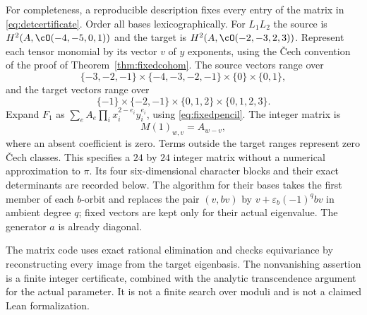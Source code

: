 For completeness, a reproducible description fixes every entry of the
matrix in \eqref{eq:detcertificate}. Order all bases lexicographically.
For $L_1L_2$ the source is $H^2(A,\cO(-4,-5,0,1))$ and the target is
$H^2(A,\cO(-2,-3,2,3))$. Represent each tensor monomial by its vector
$v$ of $y$ exponents, using the \v Cech convention of the proof of
Theorem~\ref{thm:fixedcohom}. The source vectors range over
\[
 \{-3,-2,-1\}\times\{-4,-3,-2,-1\}\times\{0\}\times\{0,1\},
\]
and the target vectors range over
\[
 \{-1\}\times\{-2,-1\}\times\{0,1,2\}\times\{0,1,2,3\}.
\]
Expand $F_1$ as $\sum_e A_e\prod_i x_i^{2-e_i}y_i^{e_i}$, using
\eqref{eq:fixedpencil}. The integer matrix is
\[
 M(1)_{w,v}=A_{w-v},
\]
where an absent coefficient is zero. Terms outside the target ranges
represent zero \v Cech classes. This specifies a $24$ by $24$ integer
matrix without a numerical approximation to $\pi$.
Its four six-dimensional character blocks and their exact determinants
are recorded below. The algorithm for their bases takes the first member
of each $b$-orbit and replaces the pair $(v,bv)$ by
$v+\varepsilon_b(-1)^q bv$ in ambient degree $q$; fixed vectors are kept
only for their actual eigenvalue. The generator $a$ is already diagonal.


The matrix code uses exact rational elimination and checks equivariance
by reconstructing every image from the target eigenbasis. The
nonvanishing assertion is a finite integer certificate, combined with
the analytic transcendence argument for the actual parameter. It is not
a finite search over moduli and is not a claimed Lean formalization.

